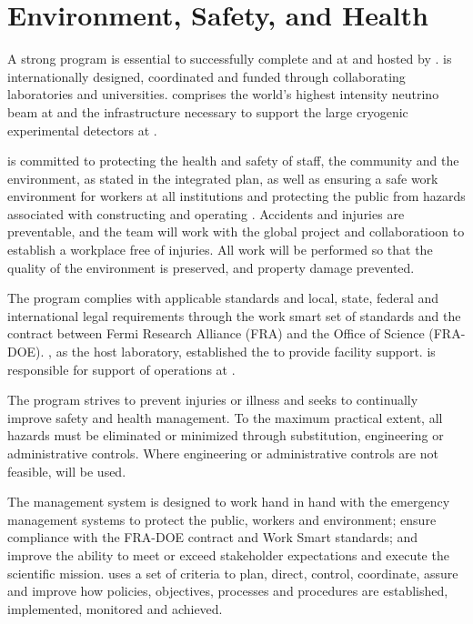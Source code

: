 \chapter{Environment, Safety, and Health}
\label{vl:tc-ESH}


A strong  program is essential to successfully complete
 and  at  and hosted by \fnal.
 is internationally designed, coordinated and funded
through collaborating laboratories and universities.  
comprises the world's highest intensity neutrino beam at \fnal and the
infrastructure necessary to support the large cryogenic experimental
detectors at .

 is committed to protecting the health and safety of
staff, the community and the environment, as stated in the
 integrated  plan, as well as ensuring a
safe work environment for  workers at all institutions and
protecting the public from hazards associated with constructing and
operating . Accidents and injuries are preventable, and
the  team will work with the global 
project and collaboratioon to establish a workplace free of injuries.
All work will be performed so that the quality of the environment is
preserved, and property damage prevented.

The   program complies with applicable
standards and local, state, federal and international legal
requirements through the \fnal work smart set of standards and the
contract between Fermi Research Alliance (FRA) and the 
Office of Science (FRA-DOE). \fnal, as the host laboratory,
established the  to provide facility support.
 is responsible for support of 
operations at .

The   program strives to prevent
injuries or illness and seeks to continually improve safety and health
management.  To the maximum practical extent, all hazards must be
eliminated or minimized through substitution, engineering or
administrative controls.  Where engineering or administrative controls
are not feasible,  will be used.

The   management system is
designed to work hand in hand with the  emergency
management systems to protect the public, workers and environment;
ensure compliance with the FRA-DOE contract and \fnal Work Smart
standards; and improve the  ability to meet or
exceed stakeholder expectations and execute the
scientific mission.   uses a set of criteria to plan, direct,
control, coordinate, assure and improve how  policies,
objectives, processes and procedures are established, implemented,
monitored and achieved.

